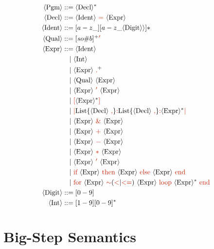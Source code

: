 \documentclass[letterpaper,12pt]{article}
\begin{document}
\newcommand{\nt}[1]{\textcolor{syntax_color}{#1}}
\newcommand{\ntext}[1]{\textcolor{syntax_color}{\text{#1}}}
\newcommand{\term}[1]{\langle \text{#1} \rangle}
\begin{align*}
    \term{Pgm} &::= \langle \text{Decl} \rangle^* \\
    \langle \text{Decl} \rangle &::= \term{Ident} \ \ntext{=} \ \langle \text{Expr} \rangle \\
    \term{Ident} &::= [a-z\_][a-z\_\term{Digit} \rangle]* \\
    \term{Qual} &::= [so\#b]^+\textcolor{syntax_color}{'} \\
    \term{Expr} &::= \langle \text{Ident} \rangle \\
    &\quad | \ \langle \text{Int} \rangle \\
    &\quad | \ \term{Expr} \ \textcolor{syntax_color}{.}^+ \\
    &\quad | \ \term{Qual} \ \term{Expr} \\
    &\quad | \ \term{Expr} \ \nt{'} \ \term{Expr} \\
    &\quad | \ \nt{[} \term{Expr}^* \nt{]} \\
    &\quad | \ \nt{|} \text{List}\lbrace \term{Decl}\ \nt{,}\rbrace\nt{:} \text{List}\lbrace \term{Decl}\ \nt{,}\rbrace \nt{:} \term{Expr}^* \nt{|} \\
    &\quad | \ \term{Expr} \ \nt{\&} \ \term{Expr} \\
    &\quad | \ \term{Expr} \ \nt{+} \ \term{Expr} \\
    &\quad | \ \term{Expr} \ \nt{-} \ \term{Expr} \\
    &\quad | \ \term{Expr} \ \nt{*} \ \term{Expr} \\
    &\quad | \ \term{Expr} \ \nt{'} \ \term{Expr} \\
    &\quad | \ \ntext{\text{if}}\  \term{Expr} \ \ntext{then}\ \term{Expr} \ \ntext{else}\ \term{Expr} \ \ntext{end} \\
    &\quad | \ \textcolor{syntax_color}{\text{for}}\  \term{Expr} \ \textcolor{syntax_color}{\sim}{(\nt{<}|\nt{<=})}\ \term{Expr} \ \textcolor{syntax_color}{\text{loop}}\ \term{Expr}^* \ \ntext{end} \\    
   \term{Digit} &::= {[0-9]} \\
    \term{Int} &::= {[1-9][0-9]^*}
\end{align*}


\section{Big-Step Semantics}
\end{document}
